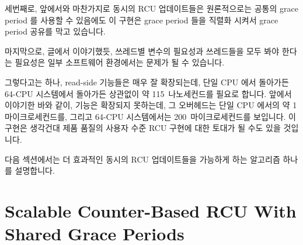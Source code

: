 세번째로, 앞에서와 마찬가지로 동시의 RCU 업데이트들은 원론적으로는 공통의 grace
period 를 사용할 수 있음에도 이 구현은 grace period 들을 직렬화 시켜서 grace
period 공유를 막고 있습니다.

마지막으로, 글에서 이야기했듯, 쓰레드별 변수의 필요성과 쓰레드들을 모두 봐야
한다는 필요성은 일부 소프트웨어 환경에서는 문제가 될 수 있습니다.
\iffalse

This implementation still has several shortcomings.
First, the need to flip \co{rcu_idx} twice imposes substantial overhead
on updates, especially if there are large numbers of threads.

Second, \co{synchronize_rcu()} must now examine a number of variables
that increases linearly with the number of threads, imposing substantial
overhead on applications with large numbers of threads.

Third, as before, although concurrent RCU updates could in principle
be satisfied by a common grace period, this implementation serializes
grace periods, preventing grace-period sharing.

Finally, as noted in the text, the need for per-thread variables
and for enumerating threads may be problematic in some software
environments.
\fi

그렇다고는 하나, read-side 기능들은 매우 잘 확장되는데, 단일 CPU 에서 돌아가든
64-CPU  시스템에서 돌아가든 상관없이 약 115~나노세컨드를 필요로
합니다.
앞에서 이야기한 바와 같이,  기능은 확장되지 못하는데, 그
오버헤드는 단일  CPU 에서의 약 1 마이크로세컨드를, 그리고 64-CPU
시스템에서는 200~마이크로세컨드를 보입니다.
이 구현은 생각건대 제품 품질의 사용자 수준 RCU 구현에 대한 토대가 될 수도 있을
것입니다.

다음 섹션에서는 더 효과적인 동시의 RCU 업데이트들을 가능하게 하는 알고리즘
하나를 설명합니다.
\iffalse

That said, the read-side primitives scale very nicely, requiring about
115~nanoseconds regardless of whether running on a single-CPU or a 64-CPU
\Power{5} system.
As noted above, the \co{synchronize_rcu()} primitive does not scale,
ranging in overhead from almost a microsecond on a single \Power{5} CPU
up to almost 200~microseconds on a 64-CPU system.
This implementation could conceivably form the basis for a
production-quality user-level RCU implementation.

The next section describes an algorithm permitting more efficient
concurrent RCU updates.
\fi

\section{Scalable Counter-Based RCU With Shared Grace Periods}
\label{sec:app:toyrcu:Scalable Counter-Based RCU With Shared Grace Periods}

